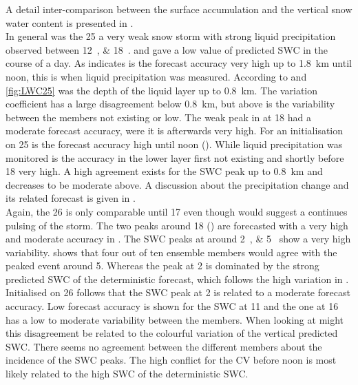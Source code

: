 A detail inter-comparison between the surface accumulation and the vertical snow water content is presented in .
\\
In general was the \SI{25}{\dec} a very weak snow storm with strong liquid precipitation observed between \SIlist{12;18}{\UTC}.  and  gave a low value of predicted SWC in the course of a day. As  indicates is the forecast accuracy very high up to \SI{1.8}{\km} until noon, this is when liquid precipitation was measured. According to  and \ref{fig:LWC25} was the depth of the liquid layer up to \SI{0.8}{\km}. The variation coefficient has a large disagreement below \SI{0.8}{\km}, but above is the variability between the members not existing or low. The weak peak in  at \SI{18}{\UTC} had a moderate forecast accuracy, were it is afterwards very high. For an initialisation on \SI{25}{\dec} is the forecast accuracy high until noon (). While liquid precipitation was monitored is the accuracy in the lower layer first not existing and shortly before \SI{18}{\UTC} very high. A high agreement exists for the SWC peak up to \SI{0.8}{\km} and decreases to be moderate above. A discussion about the precipitation change and its related forecast is given in .
\\
Again, the \SI{26}{\dec} is only comparable until \SI{17}{\UTC} even though  would suggest a continues pulsing of the storm. The two peaks around \SI{18}{\UTC} () are forecasted with a very high and moderate accuracy in . The SWC peaks at around \SIlist{2;5}{\UTC} show a very high variability.  shows that four out of ten ensemble members would agree with the peaked event around \SI{5}{\UTC}. Whereas the peak at \SI{2}{\UTC} is dominated by the strong predicted SWC of the deterministic forecast, which follows the high variation in . 
Initialised on \SI{26}{\dec} follows that the SWC peak at \SI{2}{\UTC} is related to a moderate forecast accuracy. Low forecast accuracy is shown for the SWC at \SI{11}{\UTC} and the one at \SI{16}{\UTC} has a low to moderate variability between the members.  When looking at  might this disagreement be related to the colourful variation of the vertical predicted SWC. There seems no agreement between the different members about the incidence of the SWC peaks. The high conflict for the CV before noon is most likely related to the high SWC of the deterministic SWC. 
